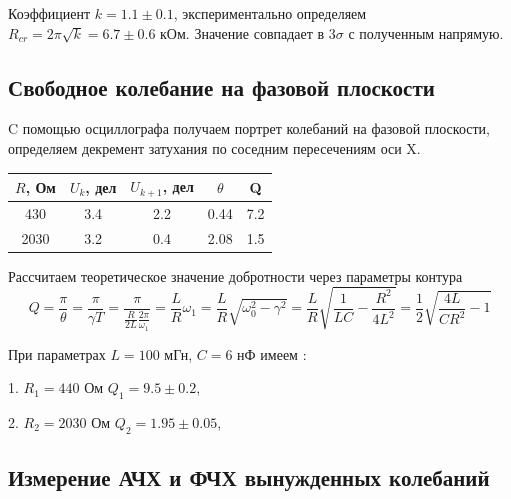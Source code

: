 \documentclass[a4paper]{article}
\begin{document}
Коэффициент $k = 1.1 \pm 0.1$, экспериментально определяем $R_{cr} = 2 \pi \sqrt{k} = 6.7 \pm 0.6 $ кОм.
Значение совпадает в $3 \sigma$ с полученным напрямую.

\subsection{Свободное колебание на фазовой плоскости}

C помощью осциллографа получаем портрет колебаний на фазовой плоскости,
определяем декремент затухания по соседним пересечениям оси X.

\begin{table}[h!]
\centering
\begin{tabular}{|c|c|c|c|c|}
\hline
\multicolumn{1}{|c|}{$R$, Ом} & \multicolumn{1}{c|}{$U_k$, дел} & \multicolumn{1}{c|}{$U_{k+1}$, дел} & \multicolumn{1}{c|}{$\theta$} & \multicolumn{1}{c|}{Q} \\ \hline
430                         & 3.4                             & 2.2                                 & 0.44                          & 7.2                    \\ \hline
2030                        & 3.2                             & 0.4                                 & 2.08                          & 1.5                    \\ \hline
\end{tabular}
\end{table}

Рассчитаем теоретическое значение добротности через параметры контура
\[Q = \frac{\pi}{\theta} = \frac{\pi}{\gamma T} = \frac{\pi}{\frac{R}{2L}\frac{2\pi}{\omega_1}} = \frac{L}{R}\omega_1 = \frac{L}{R}\sqrt{\omega_0^2 - \gamma^2} = \frac{L}{R}\sqrt{\frac{1}{LC} - \frac{R^2}{4L^2}} = \frac{1}{2}\sqrt{\frac{4L}{CR^2} - 1}\]

При параметрах $L = 100$ мГн, $C = 6$ нФ имеем :

1. $R_1 =  440$ Ом \qquad $Q_1 = 9.5 \pm 0.2$,

2. $R_2 = 2030$ Ом \qquad $Q_2 = 1.95 \pm 0.05$,

\newpage

\subsection{Измерение АЧХ и ФЧХ вынужденных колебаний}
\end{document}

